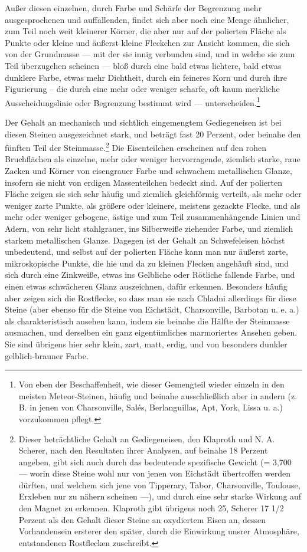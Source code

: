 \documentclass[a4paper, 11pt, oneside, german]{article}
\begin{document}
Außer diesen einzelnen, durch Farbe und Schärfe der Begrenzung mehr ausgesprochenen und auffallenden, findet sich aber noch eine Menge ähnlicher, zum Teil noch weit kleinerer Körner, die aber nur auf der polierten Fläche als Punkte oder kleine und äußerst kleine Fleckchen zur Ansicht kommen, die sich von der Grundmasse --- mit der sie innig verbunden sind, und in welche sie zum Teil überzugehen scheinen --- bloß durch eine bald etwas lichtere, bald etwas dunklere Farbe, etwas mehr Dichtheit, durch ein feineres Korn und durch ihre Figurierung -- die durch eine mehr oder weniger scharfe, oft kaum merkliche Ausscheidungslinie oder Begrenzung bestimmt wird --- unterscheiden.\footnote{Von eben der Beschaffenheit, wie dieser Gemengteil wieder einzeln in den meisten Meteor-Steinen, häufig und beinahe ausschließlich aber in andern (z. B. in jenen von Charsonville, Salés, Berlanguillas, Apt, York, Lissa u. a.) vorzukommen pflegt.}

Der Gehalt an mechanisch und sichtlich eingemengtem Gediegeneisen ist bei diesen Steinen ausgezeichnet stark, und beträgt fast 20 Perzent, oder beinahe den fünften Teil der Steinmasse.\footnote{Dieser beträchtliche Gehalt an Gediegeneisen, den Klaproth und N. A. Scherer, nach den Resultaten ihrer Analysen, auf beinahe 18 Perzent angeben, gibt sich auch durch das bedeutende spezifische Gewicht (= 3,700 --- worin diese Steine wohl nur von jenen von Eichstädt übertroffen werden dürften, und welchem sich jene von Tipperary, Tabor, Charsonville, Toulouse, Erxleben nur zu nähern scheinen ---), und durch eine sehr starke Wirkung auf den Magnet zu erkennen. Klaproth gibt übrigens noch 25, Scherer 17 1/2 Perzent als den Gehalt dieser Steine an oxydiertem Eisen an, dessen Vorhandensein ersterer den später, durch die Einwirkung unsrer Atmosphäre, entstandenen Rostflecken zuschreibt.} Die Eisenteilchen erscheinen auf den rohen Bruchflächen als einzelne, mehr oder weniger hervorragende, ziemlich starke, raue Zacken und Körner von eisengrauer Farbe und schwachem metallischen Glanze, insofern sie nicht von erdigen Massenteilchen bedeckt sind. Auf der polierten Fläche zeigen sie sich sehr häufig und ziemlich gleichförmig verteilt, als mehr oder weniger zarte Punkte, als größere oder kleinere, meistens gezackte Flecke, und als mehr oder weniger gebogene, ästige und zum Teil zusammenhängende Linien und Adern, von sehr licht stahlgrauer, ins Silberweiße ziehender Farbe, und ziemlich starkem metallischen Glanze. Dagegen ist der Gehalt an Schwefeleisen höchst unbedeutend, und selbst auf der polierten Fläche kann man nur äußerst zarte, mikroskopische Punkte, die hie und da zu kleinen Flecken angehäuft sind, und sich durch eine Zinkweiße, etwas ins Gelbliche oder Rötliche fallende Farbe, und einen etwas schwächeren Glanz auszeichnen, dafür erkennen. Besonders häufig aber zeigen sich die Rostflecke, so dass man sie nach Chladni allerdings für diese Steine (aber ebenso für die Steine von Eichstädt, Charsonville, Barbotan u. e. a.) als charakteristisch ansehen kann, indem sie beinahe die Hälfte der Steinmasse ausmachen, und derselben ein ganz eigentümliches marmoriertes Ansehen geben. Sie sind übrigens hier sehr klein, zart, matt, erdig, und von besonders dunkler gelblich-brauner Farbe.
\end{document}
